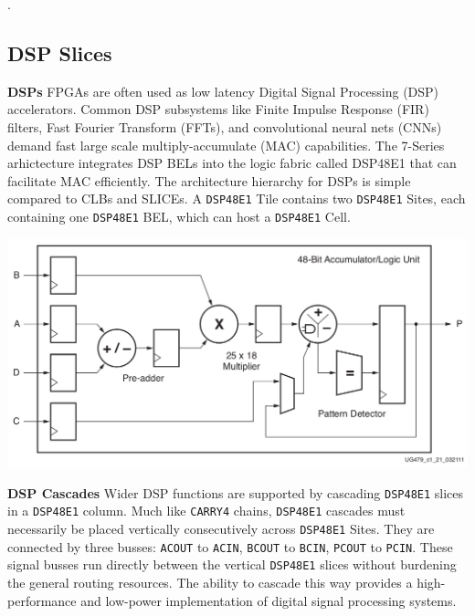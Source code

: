 \begin{multicols}{2}
\vspace{1.0cm}
.

\newpage
\subsection{DSP Slices}

\textbf{DSPs} \quad 
FPGAs are often used as low latency Digital Signal Processing (DSP) accelerators. 
Common DSP subsystems like Finite Impulse Response (FIR) filters, Fast Fourier Transform (FFTs), and convolutional neural nets (CNNs) demand fast large scale multiply-accumulate (MAC) capabilities. 
The 7-Series arhictecture integrates DSP BELs into the logic fabric called DSP48E1 that can facilitate MAC efficiently. 
The architecture hierarchy for DSPs is simple compared to CLBs and SLICEs. 
A \texttt{DSP48E1} Tile contains two \texttt{DSP48E1} Sites, each containing one \texttt{DSP48E1} BEL, which can host a \texttt{DSP48E1} Cell. 

{
    \centering
    \includegraphics[width=\columnwidth]{figures/dsp_diagram.png}
    \label{dsp_diagram}
}
\vspace{0.5cm}

\textbf{DSP Cascades} \quad 
Wider DSP functions are supported by cascading \texttt{DSP48E1} slices in a \texttt{DSP48E1} column.
Much like \texttt{CARRY4} chains, \texttt{DSP48E1} cascades must necessarily be placed vertically consecutively across \texttt{DSP48E1} Sites. 
They are connected by three busses: \texttt{ACOUT} to \texttt{ACIN}, \texttt{BCOUT} to \texttt{BCIN}, \texttt{PCOUT} to \texttt{PCIN}.
These signal busses run directly between the vertical \texttt{DSP48E1} slices without burdening the general routing resources. 
The ability to cascade this way provides a high-performance and low-power implementation of digital signal processing systems. 


\end{multicols}
